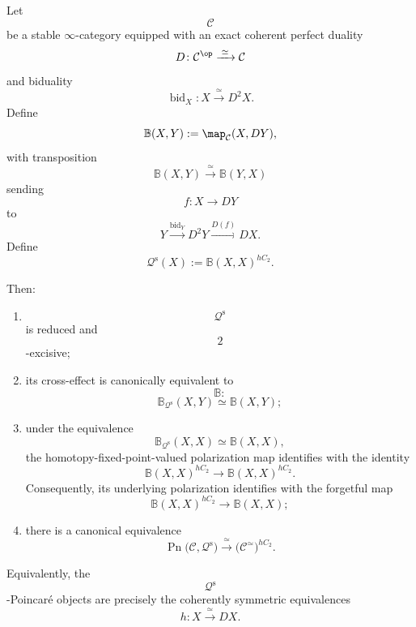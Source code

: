 \begin{proposition}
\label{prop:hermitian-as-poincare}
Let
\[
    \mathcal C
\]
be a stable $\infty$-category equipped with an exact coherent perfect
duality
\[
    D
    \colon
    \mathcal C^{\op}
    \xrightarrow{\;\simeq\;}
    \mathcal C
\]
and biduality
\[
    \operatorname{bid}_X
    \colon
    X
    \xrightarrow{\;\simeq\;}
    D^2X.
\]
Define
\[
    \mathbb B(X,Y)
    :=
    \map_{\mathcal C}(X,DY),
\]
with transposition
\[
    \mathbb B(X,Y)
    \xrightarrow{\;\simeq\;}
    \mathbb B(Y,X)
\]
sending
\[
    f
    \colon
    X
    \longrightarrow
    DY
\]
to
\[
    Y
    \xrightarrow{\operatorname{bid}_Y}
    D^2Y
    \xrightarrow{D(f)}
    DX.
\]
Define
\[
    \mathcal Q^{\mathrm s}(X)
    :=
    \mathbb B(X,X)^{hC_2}.
\]

Then:
\begin{enumerate}[label=(\roman*)]
    \item
    \[
        \mathcal Q^{\mathrm s}
    \]
    is reduced and
    \[
        2
    \]
    -excisive;

    \item its cross-effect is canonically equivalent to
    \[
        \mathbb B:
    \]
    \[
        \mathbb B_{\mathcal Q^{\mathrm s}}(X,Y)
        \simeq
        \mathbb B(X,Y);
    \]

    \item under the equivalence
    \[
        \mathbb B_{\mathcal Q^{\mathrm s}}(X,X)
        \simeq
        \mathbb B(X,X),
    \]
    the homotopy-fixed-point-valued polarization map identifies with the
    identity
    \[
        \mathbb B(X,X)^{hC_2}
        \longrightarrow
        \mathbb B(X,X)^{hC_2}.
    \]
    Consequently, its underlying polarization identifies with the
    forgetful map
    \[
        \mathbb B(X,X)^{hC_2}
        \longrightarrow
        \mathbb B(X,X);
    \]

    \item there is a canonical equivalence
    \[
        \operatorname{Pn}
        \bigl(
            \mathcal C,
            \mathcal Q^{\mathrm s}
        \bigr)
        \xrightarrow{\;\simeq\;}
        \bigl(
            \mathcal C^\simeq
        \bigr)^{hC_2}.
    \]
\end{enumerate}

Equivalently, the
\[
    \mathcal Q^{\mathrm s}
\]
-Poincar\'e objects are precisely the coherently symmetric equivalences
\[
    h
    \colon
    X
    \xrightarrow{\;\simeq\;}
    DX.
\]
\end{proposition}
